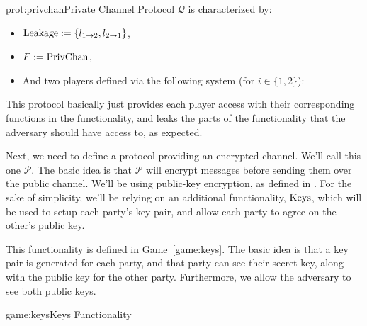 \begin{protocol}{prot:privchan}{Private Channel Protocol}
    $\mathcal{Q}$ is characterized by:
    \begin{itemize}
        \item $\text{Leakage} := \{l_{1\to 2}, l_{2\to1}\}$,
        \item $F := \text{PrivChan}$,
        \item And two players defined via the following system (for $i \in \{1, 2\}$):
    \end{itemize}

\end{protocol}

This protocol basically just provides each player access with their corresponding
functions in the functionality, and leaks the parts of the functionality
that the adversary should have access to, as expected.

Next, we need to define a protocol providing an encrypted channel.
We'll call this one $\mathcal{P}$.
The basic idea is that $\mathcal{P}$ will encrypt messages before sending
them over the public channel.
We'll be using public-key encryption, as defined in .
For the sake of simplicity, we'll be relying on an additional functionality,
$\text{Keys}$, which will be used to setup each party's key pair, and allow
each party to agree on the other's public key.

This functionality is defined in Game~\ref{game:keys}.
The basic idea is that a key pair is generated for each party,
and that party can see their secret key, along with the public key for the other party.
Furthermore, we allow the adversary to see both public keys.

\begin{game}{game:keys}{Keys Functionality}
\end{game}

